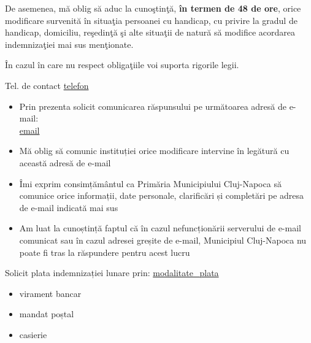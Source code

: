 \documentclass[11pt,a4paper]{article}
\newcommand{\checkboxempty}{$\square$}
\begin{document}
\vspace{0.25cm}

\hspace{1cm}De asemenea, mă oblig să aduc la cunoştinţă, \textbf{în termen de 48 de ore}, orice modificare survenită în situaţia persoanei cu handicap, cu privire la gradul de handicap, domiciliu, reşedinţă şi alte situaţii de natură să modifice acordarea indemnizaţiei mai sus menţionate.

\vspace{0.25cm}

\hspace{1cm}În cazul în care nu respect obligaţiile voi suporta rigorile legii.

\vspace{0.25cm}

Tel. de contact \underline{ {{telefon}} }

\vspace{0.3cm}

\begin{itemize}[leftmargin=*,label=\checkboxempty]
\item Prin prezenta solicit comunicarea răspunsului pe următoarea adresă de e-mail:\\
\underline{ {{email}} }
\item Mă oblig să comunic instituției orice modificare intervine în legătură cu această adresă de e-mail
\item Îmi exprim consimțământul ca Primăria Municipiului Cluj-Napoca să comunice orice informații, date personale, clarificări și completări pe adresa de e-mail indicată mai sus
\item Am luat la cunoștință faptul că în cazul nefuncționării serverului de e-mail comunicat sau în cazul adresei greșite de e-mail, Municipiul Cluj-Napoca nu poate fi tras la răspundere pentru acest lucru
\end{itemize}

\vspace{0.3cm}

Solicit plata indemnizației lunare prin: \underline{ {{modalitate_plata}} }

\vspace{0.3cm}

\begin{itemize}[leftmargin=*,label=\checkboxempty]
\item virament bancar
\item mandat poștal
\item casierie
\end{itemize}
\end{document}

